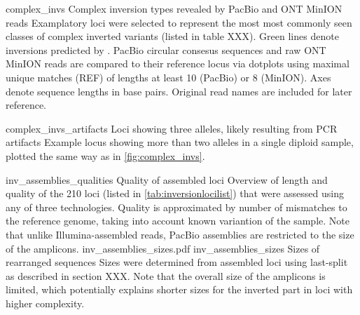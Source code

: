 \begin{table}[ht]
\begin{adjustbox}{inner,minipage=[b]{\textplusmargin}}
            \hspace{0.04\textplusmargin}
            \begin{minipage}[t]{0.42\textplusmargin}
                \centering
            \end{minipage}
        \end{adjustbox}
\end{table}





    {complex_invs}
    {Complex inversion types revealed by PacBio and ONT MinION reads}
    {Examplatory loci were selected to represent the most most commonly seen
    classes of complex inverted variants (listed in table XXX).
    Green lines denote inversions predicted by \delly. PacBio circular
    consesus sequences and raw ONT MinION reads are compared to their reference
    locus via dotplots using maximal unique matches (REF) of
    lengths at least 10 (PacBio) or 8 (MinION). Axes denote sequence lengths in
    base pairs. Original read names are included for later reference.}

    {complex_invs_artifacts}
    {Loci showing three alleles, likely resulting from PCR artifacts}
    {Example locus showing more than two alleles in a single diploid sample,
    plotted the same way as in \cref{fig:complex_invs}.}



    {inv_assemblies_qualities}
    {Quality of assembled loci}
    {Overview of length and quality of the 210 loci (listed in
    \cref{tab:inversionlocilist}) that were assessed using
    any of three technologies. Quality is approximated by number of mismatches
    to the reference genome, taking into account known variantion of the sample.
    Note that unlike Illumina-assembled reads, PacBio assemblies are restricted
    to the size of the amplicons.}
        {inv_assemblies_sizes.pdf}
    {inv_assemblies_sizes}
    {Sizes of rearranged sequences}
    {Sizes were determined from assembled loci using \acs{last}-split as
    described in section XXX. Note that the overall size of the amplicons
    is limited, which potentially explains shorter sizes for the inverted part
    in loci with higher complexity.}

